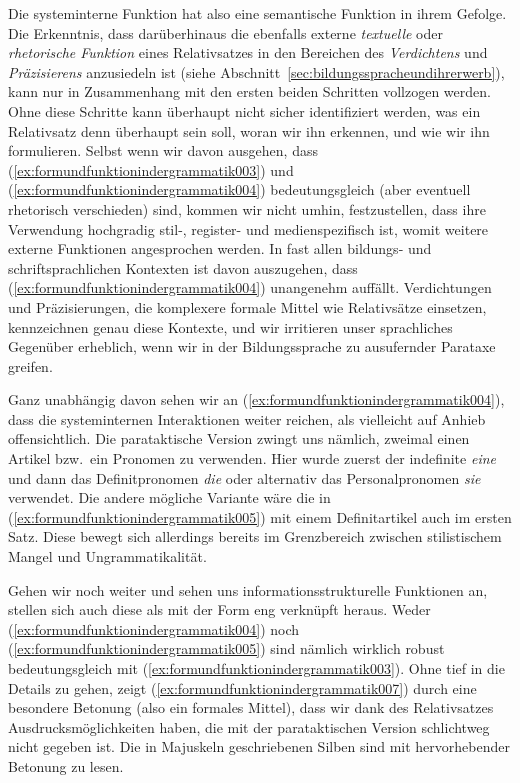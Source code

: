 Die systeminterne Funktion hat also eine semantische Funktion in ihrem Gefolge.
Die Erkenntnis, dass darüberhinaus die ebenfalls externe \textit{textuelle} oder \textit{rhetorische Funktion} eines Relativsatzes in den Bereichen des \textit{Verdichtens} und \textit{Präzisierens} anzusiedeln ist (siehe Abschnitt~\ref{sec:bildungsspracheundihrerwerb}), kann nur in Zusammenhang mit den ersten beiden Schritten vollzogen werden.
Ohne diese Schritte kann überhaupt nicht sicher identifiziert werden, was ein Relativsatz denn überhaupt sein soll, woran wir ihn erkennen, und wie wir ihn formulieren.
Selbst wenn wir davon ausgehen, dass (\ref{ex:formundfunktionindergrammatik003}) und (\ref{ex:formundfunktionindergrammatik004}) bedeutungsgleich (aber eventuell rhetorisch verschieden) sind, kommen wir nicht umhin, festzustellen, dass ihre Verwendung hochgradig stil-, register- und medienspezifisch ist, womit weitere externe Funktionen angesprochen werden.
In fast allen bildungs- und schriftsprachlichen Kontexten ist davon auszugehen, dass (\ref{ex:formundfunktionindergrammatik004}) unangenehm auffällt.
Verdichtungen und Präzisierungen, die komplexere formale Mittel wie Relativsätze einsetzen, kennzeichnen genau diese Kontexte, und wir irritieren unser sprachliches Gegenüber erheblich, wenn wir in der Bildungssprache zu ausufernder Parataxe greifen.

Ganz unabhängig davon sehen wir an (\ref{ex:formundfunktionindergrammatik004}), dass die systeminternen Interaktionen weiter reichen, als vielleicht  auf Anhieb offensichtlich.
Die parataktische Version zwingt uns nämlich, zweimal einen Artikel bzw.\ ein Pronomen zu verwenden.
Hier wurde zuerst der indefinite \textit{eine} und dann das Definitpronomen \textit{die} oder alternativ das Personalpronomen \textit{sie} verwendet.
Die andere mögliche Variante wäre die in (\ref{ex:formundfunktionindergrammatik005}) mit einem Definitartikel auch im ersten Satz.
Diese bewegt sich allerdings bereits im Grenzbereich zwischen stilistischem Mangel und Ungrammatikalität.

\begin{exe}
\end{exe}

Gehen wir noch weiter und sehen uns informationsstrukturelle Funktionen an, stellen sich auch diese als mit der Form eng verknüpft heraus.
Weder (\ref{ex:formundfunktionindergrammatik004}) noch (\ref{ex:formundfunktionindergrammatik005}) sind nämlich wirklich robust bedeutungsgleich mit (\ref{ex:formundfunktionindergrammatik003}).
Ohne tief in die Details zu gehen, zeigt (\ref{ex:formundfunktionindergrammatik007}) durch eine besondere Betonung (also ein formales Mittel), dass wir dank des Relativsatzes Ausdrucksmöglichkeiten haben, die mit der parataktischen Version schlichtweg nicht gegeben ist.
Die in Majuskeln geschriebenen Silben sind mit hervorhebender Betonung zu lesen.

